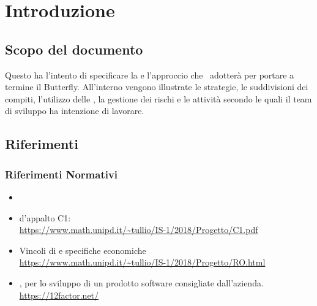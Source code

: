 \newpage
\section{Introduzione} \label{Introduzione}
	
	\subsection{Scopo del documento}
	Questo  ha l'intento di specificare la  e l'approccio che \gruppo\ adotterà per portare a termine il  Butterfly.
	All'interno vengono illustrate le strategie, le suddivisioni dei compiti, l'utilizzo delle , la gestione dei rischi e le attività secondo le quali il team di sviluppo ha intenzione di lavorare.

    

	
	\subsection{Riferimenti}
		\subsubsection{Riferimenti Normativi}
			\begin{itemize}
				\item \NdPd
				\item {} d'appalto C1:\\
				\url{https://www.math.unipd.it/~tullio/IS-1/2018/Progetto/C1.pdf}
				\item Vincoli di  e specifiche economiche\\
				\url{https://www.math.unipd.it/~tullio/IS-1/2018/Progetto/RO.html}
				\item {},  per lo sviluppo di un prodotto software consigliate dall'azienda.\\
				\url{https://12factor.net/}
			\end{itemize}
		
